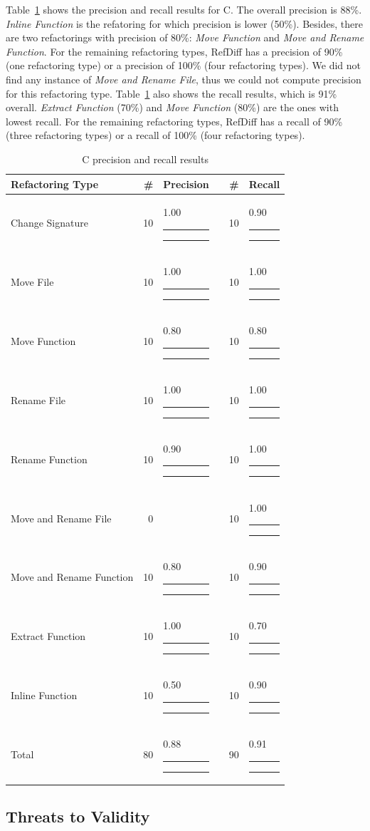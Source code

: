 \documentclass[10pt,journal,compsoc]{IEEEtran}
\newcommand\xbar[1]{#1 {\color{darkgray} \rule{\dimexpr #1pt * 16}{5.5pt}}{\color{lightgray} \rule{\dimexpr 16pt - (#1pt * 16)}{5.5pt}}}
\begin{document}
Table~\ref{TabResultC} shows the precision and recall results for C. The overall precision is 88\%. \textit{Inline Function} is the refatoring for which precision is lower (50\%). Besides, there are two refactorings with precision of 80\%: \textit{Move Function} and \textit{Move and Rename Function}. For the remaining refactoring types, RefDiff has a precision of 90\% (one refactoring type) or a precision of 100\% (four refactoring types).
We did not find any instance of \textit{Move and Rename File}, thus we could not compute precision for this refactoring type.
Table~\ref{TabResultC} also shows the recall results, which is 91\% overall.
\textit{Extract Function} (70\%) and \textit{Move Function} (80\%) are the ones with lowest recall.
For the remaining refactoring types, RefDiff has a recall of 90\% (three refactoring types) or a recall of 100\% (four refactoring types).



\begin{table}[htbp]
\renewcommand{\arraystretch}{1.2}
\caption{C precision and recall results}
\label{TabResultC}
\centering
\begin{tabular}{@{}lrllrl@{}}
\toprule
Refactoring Type & \# & Precision & & \# & Recall\\
\midrule
Change Signature & 10 & \xbar{1.00} & & 10 & \xbar{0.90}\\
Move File & 10 & \xbar{1.00} & & 10 & \xbar{1.00} \\
Move Function & 10 & \xbar{0.80} & & 10 & \xbar{0.80} \\
Rename File & 10 & \xbar{1.00} & & 10 & \xbar{1.00} \\
Rename Function & 10 & \xbar{0.90} & & 10 & \xbar{1.00} \\
Move and Rename File & 0 & & & 10 & \xbar{1.00} \\
Move and Rename Function & 10 & \xbar{0.80} & & 10 & \xbar{0.90} \\
Extract Function & 10 & \xbar{1.00} & & 10 & \xbar{0.70} \\
Inline Function & 10 & \xbar{0.50} & & 10 & \xbar{0.90} \\
\addlinespace
Total & 80 & \xbar{0.88} & & 90 & \xbar{0.91} \\
\bottomrule
\end{tabular}
\end{table}



\subsection{Threats to Validity}
\label{SecThreatsJsC}
\end{document}
